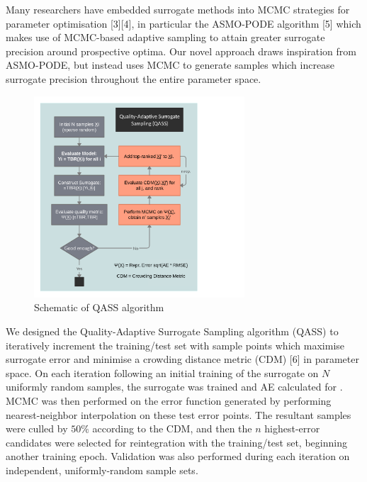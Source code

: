 Many researchers have embedded surrogate methods into MCMC strategies for parameter optimisation [3][4], in particular the ASMO-PODE algorithm [5] which makes use of MCMC-based adaptive sampling to attain greater surrogate precision around prospective optima. Our novel approach draws inspiration from ASMO-PODE, but instead uses MCMC to generate samples which increase surrogate precision throughout the entire parameter space.

\begin{figure}
  \vspace{-35pt}
  \begin{center}
    \includegraphics[width=0.7\textwidth]{fig4_qassplan.png}
    \caption{Schematic of QASS algorithm}
    \label{fig:qassplan}
  \end{center}
  \vspace{-80pt}
\end{figure}

We designed the Quality-Adaptive Surrogate Sampling algorithm (QASS) to iteratively increment the training/test set with sample points which maximise surrogate error and minimise a crowding distance metric (CDM) [6] in parameter space. On each iteration following an initial training of the surrogate on $N$ uniformly random samples, the surrogate was trained and AE calculated for . MCMC was then performed on the error function generated by performing nearest-neighbor interpolation on these test error points. The resultant samples were culled by $50\%$ according to the CDM, and then the $n$ highest-error candidates were selected for reintegration with the training/test set, beginning another training epoch. Validation was also performed during each iteration on independent, uniformly-random sample sets.



